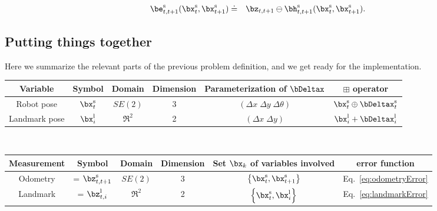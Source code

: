 \documentclass[a4paper]{article}
\begin{document}
\begin{eqnarray}
    \be^\mathrm{s}_{t,t+1}(\bx^\mathrm{s}_t, \bx^\mathrm{s}_{t+1})   & \doteq & \bz_{t,t+1} \ominus \bh^\mathrm{s}_{t,t+1}(\bx^\mathrm{s}_t, \bx^\mathrm{s}_{t+1}).
    \label{eq:odometryError}
\end{eqnarray}

\subsection{Putting things together}
Here we summarize the relevant parts of the previous problem definition,
and we get ready for the implementation.\\[.3em]
{\small
\begin{tabular}{|c|c|c|c|c|c|}
\hline
\textbf{Variable} & \textbf{Symbol}  & \textbf{Domain} & \textbf{Dimension} & \textbf{Parameterization of }$\bDeltax$   & $\boxplus$ \textbf{operator} \\
\hline
Robot    pose     & $\bx^\mathrm{s}_t$ & $SE(2)$         & 3                  & $(\Delta x \; \Delta y \; \Delta\theta)$  & $\bx^\mathrm{s}_t \oplus \bDeltax^\mathrm{s}_t$ \\
\hline
Landmark pose     & $\bx^\mathrm{l}_i$ & $\Re^2$         & 2                  & $(\Delta x \; \Delta y )$                 & $\bx^\mathrm{l}_i + \bDeltax^\mathrm{l}_i$\\
\hline
\end{tabular}\\[.3em]
\begin{tabular}{|c|c|c|c|c|c|}
\hline
\textbf{Measurement} & \textbf{Symbol}         & \textbf{Domain} & \textbf{Dimension} & \textbf{Set $\bx_k$ of variables involved}             & \textbf{error function}\\
\hline
Odometry             & = $\bz^\mathrm{s}_{t,t+1}$ & $SE(2)$         & 3                  & $\left\{ \bx^\mathrm{s}_t, \bx^\mathrm{s}_{t+1} \right\}$ & Eq.~\ref{eq:odometryError} \\
\hline
Landmark             & = $\bz^\mathrm{l}_{t,i}$   & $\Re^2$         & 2                  & $\left\{ \bx^\mathrm{s}_t, \bx^\mathrm{l}_{i} \right\}$  & Eq.~\ref{eq:landmarkError} \\
\hline
\end{tabular}}\\[.3em]
\end{document}
